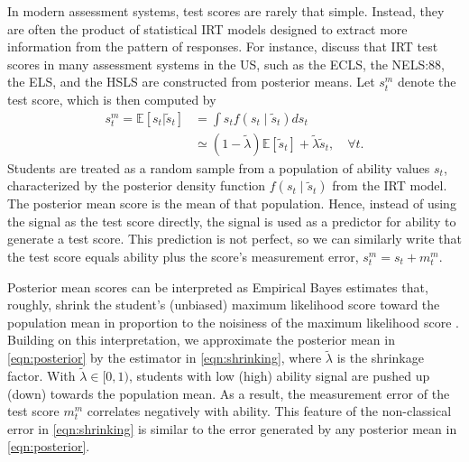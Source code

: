 In modern assessment systems, test scores are rarely that simple. Instead, they are often the product of statistical IRT models designed to extract more information from the pattern of responses. For instance, \cite{jacob2016measurement} discuss that IRT test scores in many assessment systems in the US, such as the ECLS, the NELS:88, the ELS, and the HSLS are constructed from posterior means. Let $s^m_t$ denote the test score, which is then computed by 
\begin{align} \label{eqn:posterior}
   s_{t}^m=\mathbb{E}[s_t|\widetilde{s}_t] &=\int s_t f(s_t \mid \widetilde{s}_t) d s_t \\ \label{eqn:shrinking} 
   &\simeq  (1-\widetilde{\lambda} )\mathbb{E}[\widetilde{s}_t]+\widetilde{\lambda} \widetilde{s}_t, \quad \forall t.
\end{align} 
Students are treated as a random sample from a population of ability values $s_t$, characterized by the posterior density function $f(s_t \mid \widetilde{s}_t)$ from the IRT model. The posterior mean score is the mean of that population. Hence, instead of using the signal as the test score directly, the signal is used as a predictor for ability to generate a test score. This prediction is not perfect, so we can similarly write that the test score equals ability plus the score's measurement error, $s^m_{t}=s_{t}+{m}^{m}_{t}$. 

Posterior mean scores can be interpreted as Empirical Bayes estimates that, roughly, shrink the student’s (unbiased) maximum likelihood score toward the population mean in proportion to the noisiness of the maximum likelihood score \citep{jacob2016measurement}. Building on this interpretation, we approximate the posterior mean in \eqref{eqn:posterior} by the \cite{kelley1947fundamentals} estimator in \eqref{eqn:shrinking}, where $\widetilde{\lambda}$ is the shrinkage factor. With $\widetilde{\lambda}  \in [0,1)$, students with low (high) ability signal are pushed up (down) towards the population mean. As a result, the measurement error of the test score $m_t^m$ correlates negatively with ability. This feature of the non-classical error in \eqref{eqn:shrinking} is similar to the error generated by any posterior mean in \eqref{eqn:posterior}.

